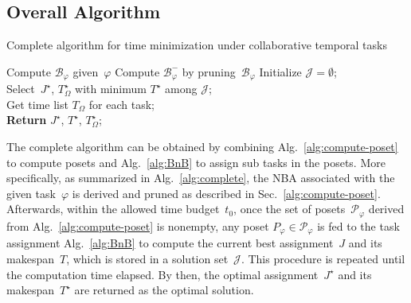 \subsection{Overall Algorithm}\label{subsubsec:overall-algorithm}

\begin{algorithm}[t]
	\caption{Complete algorithm for time minimization
        under collaborative temporal tasks}
	\label{alg:complete}
	Compute $\mathcal{B}_{\varphi}$ given~$\varphi$ 
	Compute $\mathcal{B}^{-}_{\varphi}$ by pruning~$\mathcal{B}_{\varphi}$
        Initialize $\mathcal{J}=\emptyset$;\\
        Select~$J^\star$, $T^\star_\Omega$ with minimum $T^\star$ among $\mathcal{J}$;\\
        Get time list $T_\Omega$ for each task;\\
	\textbf{Return} $J^\star$, $T^\star$, $T^\star_\Omega$;
\end{algorithm}

The complete algorithm can be obtained by combining
Alg.~\ref{alg:compute-poset} to compute posets
and Alg.~\ref{alg:BnB} to assign sub tasks in the posets.
More specifically, as summarized in Alg.~\ref{alg:complete},
the NBA associated with the given task~$\varphi$ is derived and pruned as
described in Sec.~\ref{alg:compute-poset}.
Afterwards, within the allowed time budget~$t_0$,
once the set of posets~$\mathcal{P}_{\varphi}$ derived from
Alg.~\ref{alg:compute-poset}
is nonempty, any poset $P_\varphi\in \mathcal{P}_{\varphi}$ is fed to
the task assignment Alg.~\ref{alg:BnB} to compute the current best
assignment~$J$ and its makespan~$T$, which is stored in
a solution set~$\mathcal{J}$.
This procedure is repeated until the computation time elapsed.
By then, the optimal assignment~$J^\star$ and its makespan~$T^\star$
are returned as the optimal solution.


